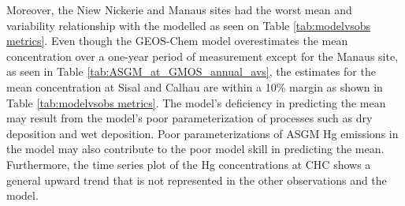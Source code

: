 \begin{flushleft}
Moreover, the Niew Nickerie and Manaus sites had the worst mean and variability relationship with the modelled \hg as seen on Table \ref{tab:modelvsobs metrics}. Even though the GEOS-Chem model overestimates the mean concentration over a one-year period of measurement except for the Manaus site, as seen in Table \ref{tab:ASGM_at_GMOS_annual_avs}, the estimates for the mean concentration at Sisal and Calhau are within a 10\% margin as shown in Table \ref{tab:modelvsobs metrics}. The model's deficiency in predicting the mean may result from the model's poor parameterization of processes such as dry deposition and wet deposition. Poor parameterizations of ASGM Hg emissions in the model may also  contribute to the poor model skill in predicting the mean. Furthermore, the time series plot of the Hg concentrations at CHC shows a general upward trend that is not represented in the other observations and the model. 
\end{flushleft}


\begin{flushleft}
  
\end{flushleft}

\begin{table}[H]
\label{tab:modelvsobs metrics}

\centering
{}

\end{table}
\begin{flushleft}
 
\end{flushleft}


